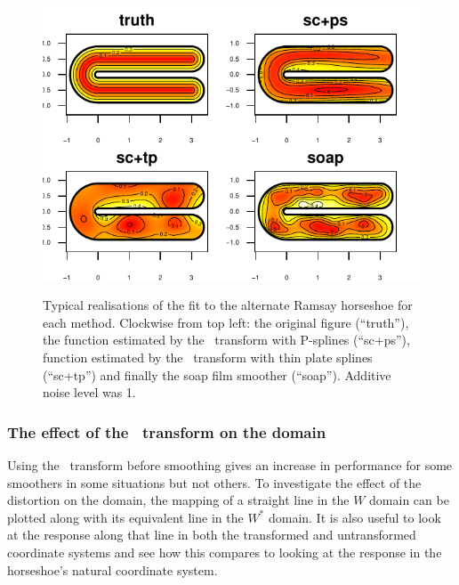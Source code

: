 \begin{figure}[t]
\centering
\includegraphics[width=6in]{sc/figs/altramsaycomp.pdf}\\
\caption{Typical realisations of the fit to the alternate Ramsay horseshoe for each method. Clockwise from top left: the original figure (``truth''), the function estimated by the \sch\ transform with P-splines (``sc+ps''), function estimated by the \sch\ transform with thin plate splines (``sc+tp'') and finally the soap film smoother (``soap''). Additive noise level was 1.}
\label{altramsaycomp}
\end{figure}


\subsubsection{The effect of the \sch\ transform on the domain}

Using the \sch\ transform before smoothing gives an increase in performance for some smoothers in some situations but not others. To investigate the effect of the distortion on the domain, the mapping of a straight line in the $W$ domain can be plotted along with its equivalent line in the $W^*$ domain. It is also useful to look at the response along that line in both the transformed and untransformed coordinate systems and see how this compares to looking at the response in the horseshoe's natural coordinate system.


